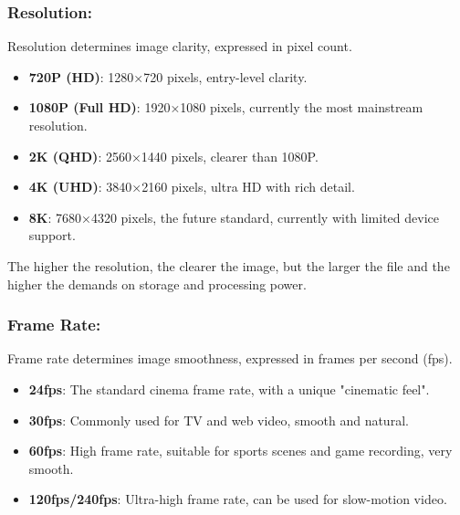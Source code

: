 


\subsubsection*{Resolution:}

Resolution determines image clarity, expressed in pixel count.

\begin{itemize}
  \item \textbf{720P (HD)}: 1280×720 pixels, entry-level clarity.
  \item \textbf{1080P (Full HD)}: 1920×1080 pixels, currently the most mainstream resolution.
  \item \textbf{2K (QHD)}: 2560×1440 pixels, clearer than 1080P.
  \item \textbf{4K (UHD)}: 3840×2160 pixels, ultra HD with rich detail.
  \item \textbf{8K}: 7680×4320 pixels, the future standard, currently with limited device support.
\end{itemize}

The higher the resolution, the clearer the image, but the larger the file and the higher the demands on storage and processing power.

\subsubsection*{Frame Rate:}

Frame rate determines image smoothness, expressed in frames per second (fps).

\begin{itemize}
  \item \textbf{24fps}: The standard cinema frame rate, with a unique "cinematic feel".
  \item \textbf{30fps}: Commonly used for TV and web video, smooth and natural.
  \item \textbf{60fps}: High frame rate, suitable for sports scenes and game recording, very smooth.
  \item \textbf{120fps/240fps}: Ultra-high frame rate, can be used for slow-motion video.
\end{itemize}


